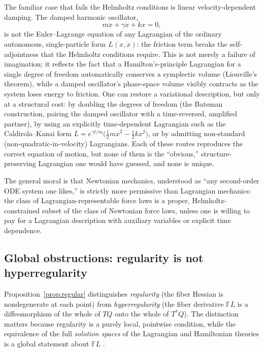\documentclass[11pt]{article}
\newcommand{\FL}{\mathbb{F}L}
\begin{document}
The familiar case that fails the Helmholtz conditions is linear velocity-dependent damping. The damped harmonic oscillator,
\begin{equation}
m\ddot x + \gamma \dot x + k x = 0 ,
\end{equation}
is not the Euler--Lagrange equation of any Lagrangian of the ordinary autonomous, single-particle form $L(x,\dot x)$: the friction term breaks the self-adjointness that the Helmholtz conditions require. This is not merely a failure of imagination; it reflects the fact that a Hamilton's-principle Lagrangian for a single degree of freedom automatically conserves a symplectic volume (Liouville's theorem), while a damped oscillator's phase-space volume visibly contracts as the system loses energy to friction. One can restore a variational description, but only at a structural cost: by doubling the degrees of freedom (the Bateman construction, pairing the damped oscillator with a time-reversed, amplified partner), by using an explicitly time-dependent Lagrangian such as the Caldirola--Kanai form $L = e^{\gamma t/m}\big(\tfrac12 m\dot x^2 - \tfrac12 kx^2\big)$, or by admitting non-standard (non-quadratic-in-velocity) Lagrangians. Each of these routes reproduces the correct equation of motion, but none of them is the ``obvious,'' structure-preserving Lagrangian one would have guessed, and none is unique.

The general moral is that Newtonian mechanics, understood as ``any second-order ODE system one likes,'' is strictly more permissive than Lagrangian mechanics: the class of Lagrangian-representable force laws is a proper, Helmholtz-constrained subset of the class of Newtonian force laws, unless one is willing to pay for a Lagrangian description with auxiliary variables or explicit time dependence.

\subsection{Global obstructions: regularity is not hyperregularity}
\label{sec:global}

Proposition~\ref{prop:regular} distinguishes \emph{regularity} (the fiber Hessian is nondegenerate at each point) from \emph{hyperregularity} (the fiber derivative $\FL$ is a diffeomorphism of the whole of $TQ$ onto the whole of $T^*Q$). The distinction matters because regularity is a purely local, pointwise condition, while the equivalence of the full \emph{solution spaces} of the Lagrangian and Hamiltonian theories is a global statement about $\FL$ \citep{abrahammarsden}.
\end{document}
